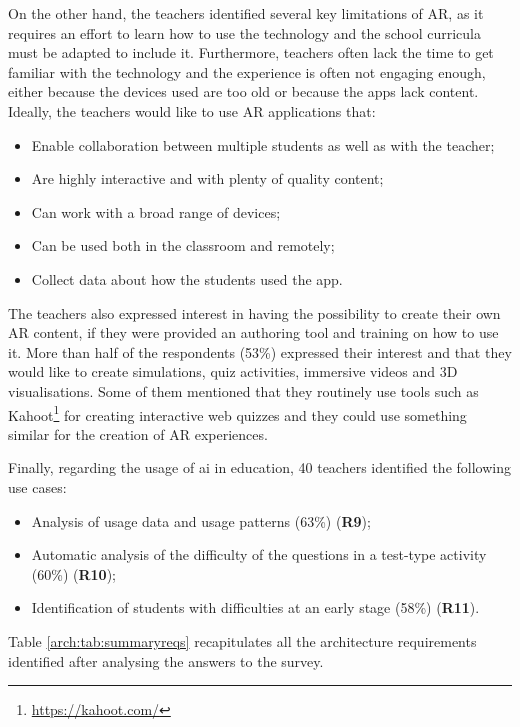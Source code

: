On the other hand, the teachers identified several key limitations of AR, as it requires an effort to learn how to use the technology and the school curricula must be adapted to include it. Furthermore, teachers often lack the time to get familiar with the technology and the experience is often not engaging enough, either because the devices used are too old or because the apps lack content. Ideally, the teachers would like to use AR applications that:
\begin{itemize}
        \item Enable collaboration between multiple students as well as with the teacher;
        \item Are highly interactive and with plenty of quality content;
        \item Can work with a broad range of devices;
        \item Can be used both in the classroom and remotely;
        \item Collect data about how the students used the app.
\end{itemize}

The teachers also expressed interest in having the possibility to create their own AR content, if they were provided an authoring tool and training on how to use it. More than half of the respondents (53\%) expressed their interest and that they would like to create simulations, quiz activities, immersive videos and 3D visualisations. Some of them mentioned that they routinely use tools such as Kahoot\footnote{\url{https://kahoot.com/}} for creating interactive web quizzes and they could use something similar for the creation of AR experiences.

Finally, regarding the usage of \gls{ai} in education, 40 teachers identified the following use cases:
\begin{itemize}
        \item Analysis of usage data and usage patterns (63\%) (\textbf{R9});
        \item Automatic analysis of the difficulty of the questions in a test-type activity (60\%) (\textbf{R10});
        \item Identification of students with difficulties at an early stage (58\%) (\textbf{R11}).
\end{itemize}

Table \ref{arch:tab:summaryreqs} recapitulates all the architecture requirements identified after analysing the answers to the survey.

